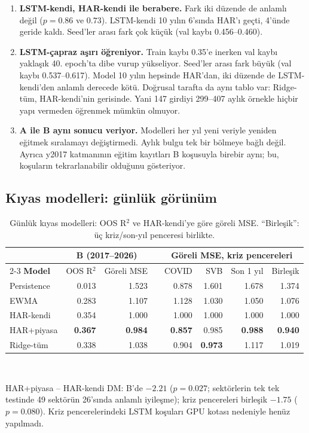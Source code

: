 \documentclass[11pt,a4paper]{article}
\newcommand{\Rsq}{R$^2$}
\newcommand{\best}[1]{\textbf{#1}}
\begin{document}
\begin{enumerate}
  \item \textbf{LSTM-kendi, HAR-kendi ile berabere.} Fark iki düzende de anlamlı değil ($p = 0.86$ ve $0.73$).
        LSTM-kendi 10 yılın 6'sında HAR'ı geçti, 4'ünde geride kaldı. Seed'ler arası fark çok küçük
        (val kaybı 0.456--0.460).
  \item \textbf{LSTM-çapraz aşırı öğreniyor.} Train kaybı 0.35'e inerken val kaybı yaklaşık 40. epoch'ta dibe vurup yükseliyor.
        Seed'ler arası fark büyük (val kaybı 0.537--0.617). Model 10 yılın hepsinde HAR'dan, iki düzende de LSTM-kendi'den
        anlamlı derecede kötü. Doğrusal tarafta da aynı tablo var: Ridge-tüm, HAR-kendi'nin gerisinde.
        Yani 147 girdiyi 299--407 aylık örnekle hiçbir yapı vermeden öğrenmek mümkün olmuyor.
  \item \textbf{A ile B aynı sonucu veriyor.} Modelleri her yıl yeni veriyle yeniden eğitmek sıralamayı değiştirmedi.
        Aylık bulgu tek bir bölmeye bağlı değil. Ayrıca y2017 katmanının eğitim kayıtları B koşusuyla birebir aynı;
        bu, koşuların tekrarlanabilir olduğunu gösteriyor.
\end{enumerate}

\subsection{Kıyas modelleri: günlük görünüm}

\begin{table}[h]
\centering\small
\caption{Günlük kıyas modelleri: OOS \Rsq{} ve HAR-kendi'ye göre göreli MSE. ``Birleşik'': üç kriz/son-yıl penceresi birlikte.}
\label{tab:daily}
\begin{tabular}{@{}lrrcrrrr@{}}
\toprule
 & \multicolumn{2}{c}{\textbf{B (2017--2026)}} & & \multicolumn{4}{c}{\textbf{Göreli MSE, kriz pencereleri}} \\
\cmidrule{2-3}\cmidrule{5-8}
\textbf{Model} & OOS \Rsq & Göreli MSE & & COVID & SVB & Son 1 yıl & Birleşik \\
\midrule
Persistence & 0.013 & 1.523 & & 0.878 & 1.601 & 1.678 & 1.374 \\
EWMA        & 0.283 & 1.107 & & 1.128 & 1.030 & 1.050 & 1.076 \\
HAR-kendi   & 0.354 & 1.000 & & 1.000 & 1.000 & 1.000 & 1.000 \\
HAR+piyasa  & \best{0.367} & \best{0.984} & & \best{0.857} & 0.985 & \best{0.988} & \best{0.940} \\
Ridge-tüm   & 0.338 & 1.038 & & 0.904 & \best{0.973} & 1.117 & 1.019 \\
\bottomrule
\end{tabular}\\[4pt]
\begin{minipage}{0.86\linewidth}\footnotesize
HAR+piyasa -- HAR-kendi DM: B'de $-2.21$ ($p=0.027$; sektörlerin tek tek testinde 49 sektörün 26'sında anlamlı iyileşme);
kriz pencereleri birleşik $-1.75$ ($p=0.080$). Kriz pencerelerindeki LSTM koşuları GPU kotası nedeniyle henüz yapılmadı.
\end{minipage}
\end{table}
\end{document}
